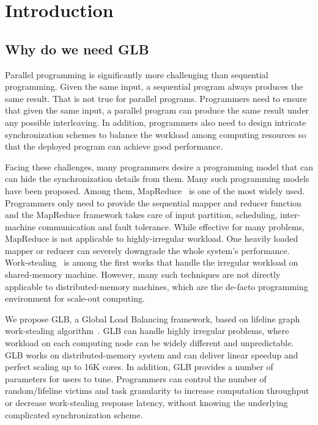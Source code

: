 \section{Introduction}
\label{sec:intro}

\subsection{Why do we need GLB}
Parallel programming is significantly more challenging than sequential programming.  Given the same input, a sequential program always produces the same result. That is not true for parallel programs. Programmers need to ensure that given the same input, a parallel program can produce the same result under any possible interleaving. In addition, programmers also need to design intricate synchronization schemes to balance the workload among computing resources so that the deployed program can achieve good performance. 

Facing these challenges, many programmers desire a programming model that can can hide the synchronization details from them. Many such programming models have been proposed. Among them, MapReduce~\cite{dean-mr} is one of the most widely used. Programmers only need to provide the sequential mapper and reducer function and the MapReduce framework takes care of input partition, scheduling, inter-machine communication and fault tolerance. While effective for many problems, MapReduce is not applicable to highly-irregular workload. One heavily loaded mapper or reducer can severely downgrade the whole system's performance. Work-stealing~\cite{FrigoLeRa98} is among the first works that handle the irregular workload on shared-memory machine. However, many such techniques are not directly applicable to distributed-memory machines, which are the de-facto programming environment for scale-out computing.

We propose GLB, a Global Load Balancing framework, based on lifeline graph work-stealing algorithm~\cite{glb}. GLB can handle highly irregular problems, where workload on each computing node can be widely different and unpredictable. GLB works on distributed-memory system and can deliver linear speedup and perfect scaling up to 16K cores. In addition, GLB provides a number of parameters for users to tune. Programmers can control the number of random/lifeline victims and task granularity to increase computation throughput or decrease work-stealing response latency, without knowing the underlying complicated synchronization scheme.
    

